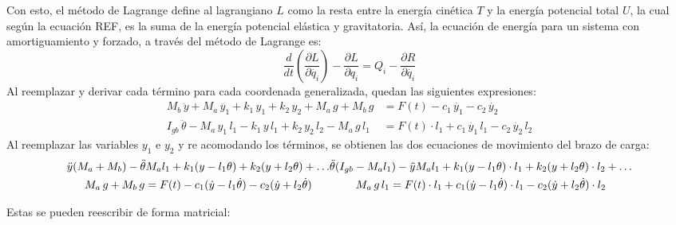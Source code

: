 Con esto, el método de Lagrange define al lagrangiano $L$ como la resta entre la energía cinética $T$ y la energía potencial total $U$, la cual según la ecuación REF, es la suma de la energía potencial elástica y gravitatoria. Así, la ecuación de energía para un sistema con amortiguamiento y forzado, a través del método de Lagrange es:
\begin{equation}
	\frac{d}{dt}\left(\frac{\partial L}{\partial \dot{q_i}}\right) - \frac{\partial L}{\partial q_i} = Q_i - \frac{\partial R}{\partial \dot{q_i}}
\end{equation}
Al reemplazar y derivar cada término para cada coordenada generalizada, quedan las siguientes expresiones:
\begin{subequations}
\begin{align}
	M_b\, \ddot{y} + M_a\, \ddot{y_1} + k_1\, y_1 + k_2\, y_2 + M_a\, g + M_b\, g &= F(t) - c_1\, \dot{y_1} - c_2\, \dot{y_2} \\
	I_{gb}\, \ddot{\theta} - M_a\, y_1\, l_1 - k_1\, y\, l_1 + k_2\, y_2\, l_2 - M_a\, g\, l_1 &= F(t)\cdot l_1 + c_1\, \dot{y_1}\, l_1 - c_2\, \dot{y_2}\, l_2 
\end{align}
\end{subequations}
Al reemplazar las variables $y_1$ e $y_2$ y re acomodando los términos, se obtienen las dos ecuaciones de movimiento del brazo de carga:
\begin{subequations}
\begin{multline}\label{eq:mov_y}
	\ddot{y}(M_a + M_b) - \ddot{\theta}M_al_1 + k_1(y - l_1\theta) + k_2(y + l_2\theta) + \dots \\
	 M_a\, g + M_b\, g = F(t) - c_1(\dot{y} - l_1\dot{\theta}) - c_2(\dot{y} + l_2\dot{\theta}) 
\end{multline} 
\vspace{-17mm}
\begin{multline}\label{eq:mov_theta}
	\ddot{\theta}(I_{gb} - M_al_1) - \ddot{y}M_al_1 + k_1(y - l_1\theta)\cdot l_1 + k_2(y + l_2\theta)\cdot l_2 + \dots \\
	M_a\, g\, l_1 = F(t)\cdot l_1 + c_1(\dot{y} - l_1\dot{\theta})\cdot l_1 - c_2(\dot{y} + l_2\dot{\theta})\cdot l_2 
\end{multline}
\end{subequations}

Estas se pueden reescribir de forma matricial:

